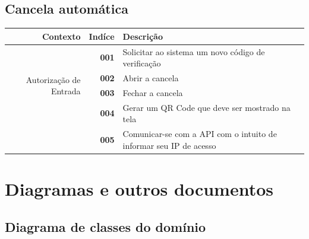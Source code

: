 \documentclass[a4paper,12pt]{article}
\begin{document}
\subsection{Cancela automática}

\begin{table}[H]
    \begin{tabularx}{\linewidth}{ | r | r | X | }
        \hline
        \bf{Contexto} &\bf{Indíce}& \bf{Descrição} \\
        \hline
        \multirow{4}{7.5em}{Autorização de Entrada}  
            & \bf{001} & Solicitar ao sistema um novo código de verificação \\ \cline{2-3}
            & \bf{002} & Abrir a cancela \\ \cline{2-3}
            & \bf{003} & Fechar a cancela \\ \cline{2-3}
            & \bf{004} & Gerar um QR Code que deve ser mostrado na tela \\ 
            & \bf{005} & Comunicar-se com a API com o intuito de informar seu IP de acesso \\
        \hline
    \end{tabularx}
\end{table}

\pagebreak

\section{Diagramas e outros documentos}

\subsection{Diagrama de classes do domínio}
\end{document}

